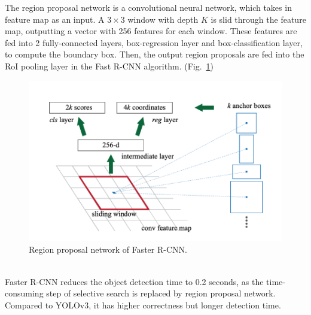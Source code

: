 \documentclass[letterpaper]{article} %
\begin{document}
\noindent The region proposal network is a convolutional neural network, which takes in feature map as an input. A $3 \times 3$ window with depth $K$ is slid through the feature map, outputting a vector with 256 features for each window. These features are fed into 2 fully-connected layers, box-regression layer and box-classification layer, to compute the boundary box. Then, the output region proposals are fed into the RoI pooling layer in the Fast R-CNN algorithm. (Fig.~\ref{fig:rpn})\\
\begin{figure}[ht]
    \hspace{-14mm}
    \centering
    \includegraphics[width=0.85\linewidth,height = 0.55\linewidth]{Figure/faster_r_cnn.png}
    \caption{\footnotesize{Region proposal network of Faster R-CNN.}}
    \label{fig:rpn}
    \vspace{0mm}
\end{figure}
\\
\noindent 
Faster R-CNN reduces the object detection time to 0.2 seconds, as the time-consuming step of selective search is replaced by region proposal network. Compared to YOLOv3, it has higher correctness but longer detection time.
\end{document}
